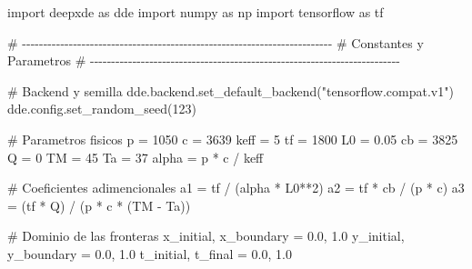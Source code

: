 \documentclass[
  spanish,
  us-letterpaper,
]{scrreprt}
\newenvironment{Shaded}{\begin{snugshade}}{\end{snugshade}}
\newcommand{\CommentTok}[1]{\textcolor[rgb]{0.37,0.37,0.37}{#1}}
\newcommand{\DecValTok}[1]{\textcolor[rgb]{0.68,0.00,0.00}{#1}}
\newcommand{\FloatTok}[1]{\textcolor[rgb]{0.68,0.00,0.00}{#1}}
\newcommand{\ImportTok}[1]{\textcolor[rgb]{0.00,0.46,0.62}{#1}}
\newcommand{\NormalTok}[1]{\textcolor[rgb]{0.00,0.23,0.31}{#1}}
\newcommand{\OperatorTok}[1]{\textcolor[rgb]{0.37,0.37,0.37}{#1}}
\newcommand{\StringTok}[1]{\textcolor[rgb]{0.13,0.47,0.30}{#1}}
\theoremstyle{plain}
\theoremstyle{definition}
\theoremstyle{remark}
\begin{document}
\begin{Shaded}
\begin{Highlighting}[]
\ImportTok{import}\NormalTok{ deepxde }\ImportTok{as}\NormalTok{ dde}
\ImportTok{import}\NormalTok{ numpy }\ImportTok{as}\NormalTok{ np}
\ImportTok{import}\NormalTok{ tensorflow }\ImportTok{as}\NormalTok{ tf}

\CommentTok{\# {-}{-}{-}{-}{-}{-}{-}{-}{-}{-}{-}{-}{-}{-}{-}{-}{-}{-}{-}{-}{-}{-}{-}{-}{-}{-}{-}{-}{-}{-}{-}{-}{-}{-}{-}{-}{-}{-}{-}{-}{-}{-}{-}{-}{-}{-}{-}{-}{-}{-}{-}{-}{-}{-}{-}{-}{-}{-}{-}{-}{-}{-}{-}{-}{-}{-}{-}{-}{-}{-}{-}{-}{-}}
\CommentTok{\# Constantes y Parametros}
\CommentTok{\# {-}{-}{-}{-}{-}{-}{-}{-}{-}{-}{-}{-}{-}{-}{-}{-}{-}{-}{-}{-}{-}{-}{-}{-}{-}{-}{-}{-}{-}{-}{-}{-}{-}{-}{-}{-}{-}{-}{-}{-}{-}{-}{-}{-}{-}{-}{-}{-}{-}{-}{-}{-}{-}{-}{-}{-}{-}{-}{-}{-}{-}{-}{-}{-}{-}{-}{-}{-}{-}{-}{-}{-}{-}}

\CommentTok{\# Backend y semilla}
\NormalTok{dde.backend.set\_default\_backend(}\StringTok{"tensorflow.compat.v1"}\NormalTok{)}
\NormalTok{dde.config.set\_random\_seed(}\DecValTok{123}\NormalTok{)}

\CommentTok{\# Parametros fisicos}
\NormalTok{p }\OperatorTok{=} \DecValTok{1050}
\NormalTok{c }\OperatorTok{=} \DecValTok{3639}
\NormalTok{keff }\OperatorTok{=} \DecValTok{5}
\NormalTok{tf }\OperatorTok{=} \DecValTok{1800}
\NormalTok{L0 }\OperatorTok{=} \FloatTok{0.05}
\NormalTok{cb }\OperatorTok{=} \DecValTok{3825}
\NormalTok{Q }\OperatorTok{=} \DecValTok{0}
\NormalTok{TM }\OperatorTok{=} \DecValTok{45}
\NormalTok{Ta }\OperatorTok{=} \DecValTok{37}
\NormalTok{alpha }\OperatorTok{=}\NormalTok{ p }\OperatorTok{*}\NormalTok{ c }\OperatorTok{/}\NormalTok{ keff}

\CommentTok{\# Coeficientes adimencionales}
\NormalTok{a1 }\OperatorTok{=}\NormalTok{ tf }\OperatorTok{/}\NormalTok{ (alpha }\OperatorTok{*}\NormalTok{ L0}\OperatorTok{**}\DecValTok{2}\NormalTok{)}
\NormalTok{a2 }\OperatorTok{=}\NormalTok{ tf }\OperatorTok{*}\NormalTok{ cb }\OperatorTok{/}\NormalTok{ (p }\OperatorTok{*}\NormalTok{ c)}
\NormalTok{a3 }\OperatorTok{=}\NormalTok{ (tf }\OperatorTok{*}\NormalTok{ Q) }\OperatorTok{/}\NormalTok{ (p }\OperatorTok{*}\NormalTok{ c }\OperatorTok{*}\NormalTok{ (TM }\OperatorTok{{-}}\NormalTok{ Ta))}

\CommentTok{\# Dominio de las fronteras}
\NormalTok{x\_initial, x\_boundary }\OperatorTok{=} \FloatTok{0.0}\NormalTok{, }\FloatTok{1.0}
\NormalTok{y\_initial, y\_boundary }\OperatorTok{=} \FloatTok{0.0}\NormalTok{, }\FloatTok{1.0}
\NormalTok{t\_initial, t\_final }\OperatorTok{=} \FloatTok{0.0}\NormalTok{, }\FloatTok{1.0}


\end{Highlighting}
\end{Shaded}
\end{document}

